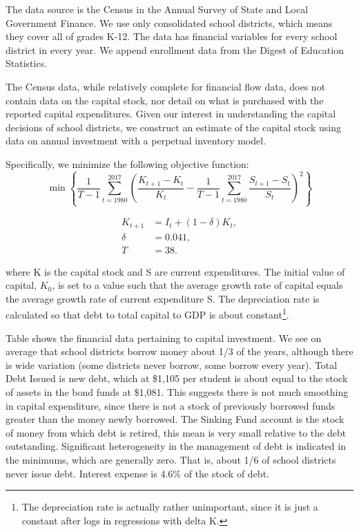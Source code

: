 The data source is the Census in the Annual Survey of State and Local Government Finance. We use only consolidated school districts, which means they cover all of grades K-12. The data has financial variables for every school district in every year. We append enrollment data from the Digest of Education Statistics.

The Census data, while relatively complete for financial flow data, does not contain data on the capital stock, nor detail on what is purchased with the reported capital expenditures. Given our interest in understanding the capital decisions of school districts, we construct an estimate of the capital stock using data on annual investment with a perpetual inventory model. 

Specifically, we minimize the following objective function: \begin{equation}
\min \left\{ \frac{1}{T-1} \sum_{t=1980}^{2017} \left( \frac{K_{t+1} - K_t}{K_t} - \frac{1}{T-1} \sum_{t=1980}^{2017} \frac{S_{t+1} - S_t}{S_t} \right)^2 \right\}
\end{equation}

\begin{equation}
\begin{aligned}
 K_{t+1} &= I_t + (1-\delta) K_t, \\
 \delta &= 0.041, \\
 T &= 38.
\end{aligned}
\end{equation}

where K is the capital stock and S are current expenditures. The initial value of capital, $K_0$, is set to a value such that the average growth rate of capital equals the average growth rate of current expenditure S. The depreciation rate is calculated so that debt to total capital to GDP is about constant\footnote{The depreciation rate is actually rather unimportant, since it is just a constant after logs in regressions with delta K.}. 

Table shows the financial data pertaining to capital investment. We see on average that school districts borrow money about 1/3 of the years, although there is wide variation (some districts never borrow, some borrow every year). Total Debt Issued is new debt, which at \$1,105 per student is about equal to the stock of assets in the bond funds at \$1,081. This suggests there is not much smoothing in capital expenditure, since there is not a stock of previously borrowed funds greater than the money newly borrowed. The Sinking Fund account is the stock of money from which debt is retired, this mean is very small relative to the debt outstanding. Significant heterogeneity in the management of debt is indicated in the minimums, which are generally zero. That is, about 1/6 of school districts never issue debt. Interest expense is 4.6\% of the stock of debt.

